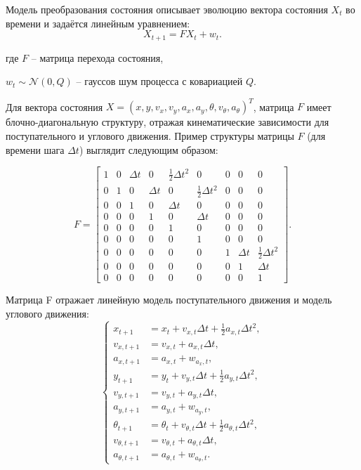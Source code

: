 Модель преобразования состояния описывает эволюцию вектора состояния \({X}_t\) во времени и задаётся линейным уравнением:
\[
{X}_{t+1} = {F} {X}_t + {w}_t.
\]
\begin{explanationx}
	\item[где] \({F}\) -- матрица перехода состояния, 
	\item \({w}_t \sim \mathcal{N}(0, {Q})\) -- гауссов шум процесса с ковариацией \({Q}\).
\end{explanationx}

Для вектора состояния \({X} = (x, y, v_x, v_y, a_x, a_y, \theta, v_\theta, a_\theta)^T\),
матрица \({F}\) имеет блочно-диагональную структуру,
отражая кинематические зависимости для поступательного и углового движения.
Пример структуры матрицы \({F}\) (для времени шага \(\Delta t\)) выглядит следующим образом:

\begin{equation}
{F} =
\begin{bmatrix}
1 & 0 & \Delta t & 0 & \frac{1}{2} \Delta t^2 & 0 & 0 & 0 & 0 \\
0 & 1 & 0 & \Delta t & 0 & \frac{1}{2} \Delta t^2 & 0 & 0 & 0 \\
0 & 0 & 1 & 0 & \Delta t & 0 & 0 & 0 & 0 \\
0 & 0 & 0 & 1 & 0 & \Delta t & 0 & 0 & 0 \\
0 & 0 & 0 & 0 & 1 & 0 & 0 & 0 & 0 \\
0 & 0 & 0 & 0 & 0 & 1 & 0 & 0 & 0 \\
0 & 0 & 0 & 0 & 0 & 0 & 1 & \Delta t & \frac{1}{2} \Delta t^2 \\
0 & 0 & 0 & 0 & 0 & 0 & 0 & 1 & \Delta t \\
0 & 0 & 0 & 0 & 0 & 0 & 0 & 0 & 1
\end{bmatrix}.
\end{equation}

Матрица F отражает линейную модель поступательного движения 
и модель углового движения:
\begin{equation}
\label{eq:state_transition_system}
\left\{
\begin{aligned}
x_{t+1} &= x_t + v_{x,t} \Delta t + \frac{1}{2} a_{x,t} \Delta t^2, \\
v_{x,t+1} &= v_{x,t} + a_{x,t} \Delta t, \\
a_{x,t+1} &= a_{x,t} + w_{a_x,t}, \\
y_{t+1} &= y_t + v_{y,t} \Delta t + \frac{1}{2} a_{y,t} \Delta t^2, \\
v_{y,t+1} &= v_{y,t} + a_{y,t} \Delta t, \\
a_{y,t+1} &= a_{y,t} + w_{a_y,t}, \\
\theta_{t+1} &= \theta_t + v_{\theta,t} \Delta t + \frac{1}{2} a_{\theta,t} \Delta t^2, \\
v_{\theta,t+1} &= v_{\theta,t} + a_{\theta,t} \Delta t, \\
a_{\theta,t+1} &= a_{\theta,t} + w_{a_\theta,t}.
\end{aligned}
\right.
\end{equation}

